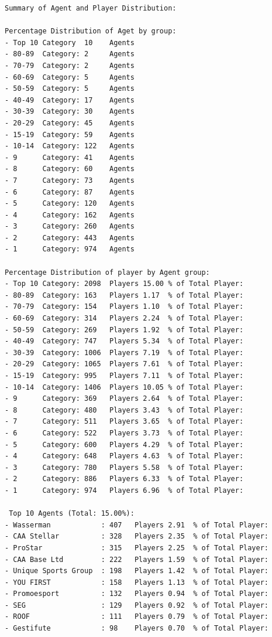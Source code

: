 \documentclass{Configuration_Files/PoliMi3i_thesis}
\begin{document}
\begin{verbatim}
Summary of Agent and Player Distribution:

Percentage Distribution of Aget by group:
- Top 10 Category  10    Agents
- 80-89  Category: 2     Agents
- 70-79  Category: 2     Agents
- 60-69  Category: 5     Agents
- 50-59  Category: 5     Agents
- 40-49  Category: 17    Agents
- 30-39  Category: 30    Agents
- 20-29  Category: 45    Agents
- 15-19  Category: 59    Agents
- 10-14  Category: 122   Agents
- 9      Category: 41    Agents
- 8      Category: 60    Agents
- 7      Category: 73    Agents
- 6      Category: 87    Agents
- 5      Category: 120   Agents
- 4      Category: 162   Agents
- 3      Category: 260   Agents
- 2      Category: 443   Agents
- 1      Category: 974   Agents

Percentage Distribution of player by Agent group:
- Top 10 Category: 2098  Players 15.00 % of Total Player: 
- 80-89  Category: 163   Players 1.17  % of Total Player: 
- 70-79  Category: 154   Players 1.10  % of Total Player: 
- 60-69  Category: 314   Players 2.24  % of Total Player: 
- 50-59  Category: 269   Players 1.92  % of Total Player: 
- 40-49  Category: 747   Players 5.34  % of Total Player: 
- 30-39  Category: 1006  Players 7.19  % of Total Player: 
- 20-29  Category: 1065  Players 7.61  % of Total Player: 
- 15-19  Category: 995   Players 7.11  % of Total Player: 
- 10-14  Category: 1406  Players 10.05 % of Total Player: 
- 9      Category: 369   Players 2.64  % of Total Player: 
- 8      Category: 480   Players 3.43  % of Total Player: 
- 7      Category: 511   Players 3.65  % of Total Player: 
- 6      Category: 522   Players 3.73  % of Total Player: 
- 5      Category: 600   Players 4.29  % of Total Player: 
- 4      Category: 648   Players 4.63  % of Total Player: 
- 3      Category: 780   Players 5.58  % of Total Player: 
- 2      Category: 886   Players 6.33  % of Total Player: 
- 1      Category: 974   Players 6.96  % of Total Player: 

 Top 10 Agents (Total: 15.00%):
- Wasserman            : 407   Players 2.91  % of Total Player: 
- CAA Stellar          : 328   Players 2.35  % of Total Player: 
- ProStar              : 315   Players 2.25  % of Total Player: 
- CAA Base Ltd         : 222   Players 1.59  % of Total Player: 
- Unique Sports Group  : 198   Players 1.42  % of Total Player: 
- YOU FIRST            : 158   Players 1.13  % of Total Player: 
- Promoesport          : 132   Players 0.94  % of Total Player: 
- SEG                  : 129   Players 0.92  % of Total Player: 
- ROOF                 : 111   Players 0.79  % of Total Player: 
- Gestifute            : 98    Players 0.70  % of Total Player: 
\end{verbatim}
\end{document}
